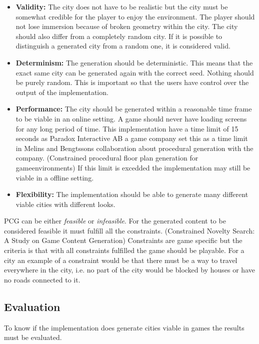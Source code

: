 	\begin{itemize}
		\item \textbf{Validity:} The city does not have to be realistic but the city must be somewhat credible for the player to enjoy the environment. The player should not lose immersion because of broken geometry within the city. The city should also differ from a completely random city. If it is possible to distinguish a generated city from a random one, it is considered valid.
		
		\item \textbf{Determinism:} The generation should be deterministic. This means that the exact same city can be generated again with the correct seed. Nothing should be purely random. This is important so that the users have control over the output of the implementation.
		
		\item \textbf{Performance:} The city should be generated within a reasonable time frame to be viable in an online setting. A game should never have loading screens for any long period of time. This implementation have a time limit of 15 seconds as Paradox Interactive AB a game company set this as a time limit in Melins and Bengtssons collaboration about procedural generation with the company. (Constrained procedural floor
		plan generation for gameenvironments) If this limit is excedded the implementation may still be viable in a offline setting.
		
		\item \textbf{Flexibility: } The implementation should be able to generate many different viable cities with different looks.
	\end{itemize} 

	PCG can be either \textit{feasible} or \textit{infeasible}. For the generated content to be considered feasible it must fulfill all the constraints. (Constrained Novelty Search: A Study on Game Content Generation) Constraints are game specific but the criteria is that with all constraints fulfilled the game should be playable. For a city an example of a constraint would be that there must be a way to travel everywhere in the city, i.e. no part of the city would be blocked by houses or have no roads connected to it.
	
	\subsection{Evaluation}
	To know if the implementation does generate cities viable in games the results must be evaluated.